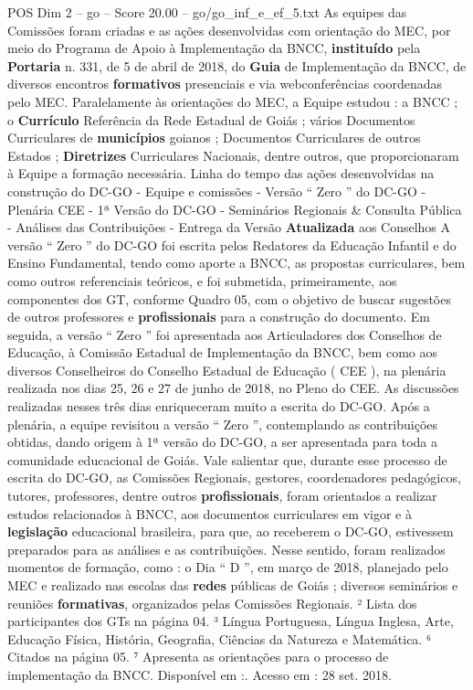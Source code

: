 \begin{textsample}{POS Dim 2 – go – Score 20.00 – go/go\_inf\_e\_ef\_5.txt}
As equipes das Comissões foram criadas e as ações desenvolvidas com orientação do MEC, por meio do Programa de Apoio à Implementação da BNCC, \textbf{instituído} pela \textbf{Portaria} n. 331, de 5 de abril de 2018, do \textbf{Guia} de Implementação da BNCC, de diversos encontros \textbf{formativos} presenciais e via webconferências coordenadas pelo MEC.
Paralelamente às orientações do MEC, a Equipe estudou : a BNCC ; o \textbf{Currículo} Referência da Rede Estadual de Goiás ; vários Documentos Curriculares de \textbf{municípios} goianos ; Documentos Curriculares de outros Estados ; \textbf{Diretrizes} Curriculares Nacionais, dentre outros, que proporcionaram à Equipe a formação necessária.
Linha do tempo das ações desenvolvidas na construção do DC-GO - Equipe e comissões - Versão “ Zero ” do DC-GO - Plenária CEE - 1ª Versão do DC-GO - Seminários Regionais \& Consulta Pública - Análises das Contribuições - Entrega da Versão \textbf{Atualizada} aos Conselhos A versão “ Zero ” do DC-GO foi escrita pelos Redatores da Educação Infantil e do Ensino Fundamental, tendo como aporte a BNCC, as propostas curriculares, bem como outros referenciais teóricos, e foi submetida, primeiramente, aos componentes dos GT, conforme Quadro 05, com o objetivo de buscar sugestões de outros professores e \textbf{profissionais} para a construção do documento.
Em seguida, a versão “ Zero ” foi apresentada aos Articuladores dos Conselhos de Educação, à Comissão Estadual de Implementação da BNCC, bem como aos diversos Conselheiros do Conselho Estadual de Educação ( CEE ), na plenária realizada nos dias 25, 26 e 27 de junho de 2018, no Pleno do CEE.
As discussões realizadas nesses três dias enriqueceram muito a escrita do DC-GO.
Após a plenária, a equipe revisitou a versão “ Zero ”, contemplando as contribuições obtidas, dando origem à 1ª versão do DC-GO, a ser apresentada para toda a comunidade educacional de Goiás.
Vale salientar que, durante esse processo de escrita do DC-GO, as Comissões Regionais, gestores, coordenadores pedagógicos, tutores, professores, dentre outros \textbf{profissionais}, foram orientados a realizar estudos relacionados à BNCC, aos documentos curriculares em vigor e à \textbf{legislação} educacional brasileira, para que, ao receberem o DC-GO, estivessem preparados para as análises e as contribuições.
Nesse sentido, foram realizados momentos de formação, como : o Dia “ D ”, em março de 2018, planejado pelo MEC e realizado nas escolas das \textbf{redes} públicas de Goiás ; diversos seminários e reuniões \textbf{formativas}, organizados pelas Comissões Regionais. ² Lista dos participantes dos GTs na página 04. ³ Língua Portuguesa, Língua Inglesa, Arte, Educação Física, História, Geografia, Ciências da Natureza e Matemática. ⁶ Citados na página 05. ⁷ Apresenta as orientações para o processo de implementação da BNCC.
Disponível em :.
Acesso em : 28 set. 2018.

\end{textsample}
